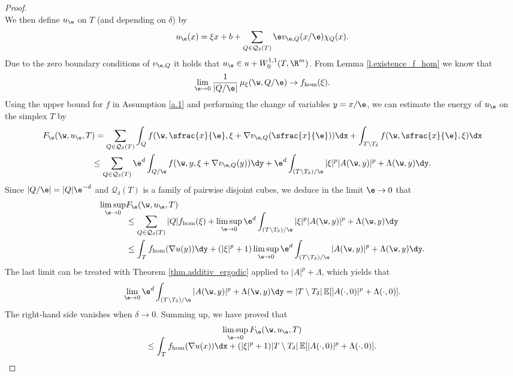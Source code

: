 \begin{proof}
\begin{equation*}
\end{equation*}
We then define $u_{\e}$ on $T$ (and depending on $\delta$) by
\begin{equation*}
u_{\e}(x)=\xi x+b+\sum_{Q\in\mathcal{Q}_{\delta}(T)}\e v_{\e, Q}(x/\e)\chi_{Q}(x).
\end{equation*} Due to the zero boundary conditions of $v_{\e,Q}$ it holds that $u_{\e}\in u+W^{1,1}_0(T,\R^m)$. From Lemma \ref{l.existence_f_hom} we know that
\begin{equation*}
\lim_{\e\to 0}\frac{1}{|Q/\e|}\,\mu_{\xi}(\w,Q/\e)\to f_{\hom}(\xi).
\end{equation*}
Using the upper bound for $f$ in Assumption \ref{a.1} and performing the change of variables $y=x/\e$, we can estimate the energy of $u_{\e}$ on the simplex $T$ by
\begin{multline*}
F_{\e}(\w,u_{\e},T)= \sum_{Q\in\mathcal{Q}_{\delta}(T)}\int_Qf(\w,\sfrac{x}{\e},\xi+\nabla v_{\e,Q}(\sfrac{x}{\e}))\dx+\int_{T\setminus T_{\delta}}f(\w,\sfrac{x}{\e},\xi)\dx
\\
\leq  \sum_{Q\in\mathcal{Q}_{\delta}(T)}\e^{d}\int_{Q/\e}f(\w,y,\xi+\nabla v_{\e,Q}(y))\dy+\e^d\int_{(T\setminus T_{\delta})/\e}|\xi|^p|A(\w,y)|^p+\Lambda(\w,y)\dy.
\end{multline*}
Since $|Q/\e|=|Q|\e^{-d}$ and $\mathcal{Q}_{\delta}(T)$ is a family of pairwise disjoint cubes, we deduce in the limit $\e\to 0$ that
\begin{align*}
\limsup_{\e\to 0}&F_{\e}(\w,u_{\e},T)
\\[-8pt]
&\leq  \sum_{Q\in\mathcal{Q}_{\delta}(T)}|Q|f_{\hom}(\xi)+\limsup_{\e\to 0}\e^d\int_{(T\setminus T_{\delta})/\e}|\xi|^p|A(\w,y)|^p+\Lambda(\w,y)\dy
\\
&\leq  \int_T f_{\hom}(\nabla u(y))\dy+(|\xi|^p+1)\limsup_{\e\to 0}\e^d\int_{(T\setminus T_{\delta})/\e}|A(\w,y)|^p+\Lambda(\w,y)\dy.
\end{align*}
The last limit can be treated with Theorem \ref{thm.additiv_ergodic} applied to $|A|^p+\Lambda$, which yields that
\begin{equation*}
\lim_{\e\to 0}\e^d\int_{(T\setminus T_{\delta})/\e}|A(\w,y)|^p+\Lambda(\w,y)\dy=|T\setminus T_{\delta}|\,\mathbb{E}[|A(\cdot,0)|^p+\Lambda(\cdot,0)].
\end{equation*}
The right-hand side vanishes when $\delta\to 0$. Summing up, we have proved that
\begin{multline}\label{eq:almost_recovery}
\limsup_{\e\to 0}F_{\e}(\w,u_{\e},T)\\[-8pt]
\leq \int_Tf_{\hom}(\nabla u(x))\dx+(|\xi|^p+1)|T\setminus T_{\delta}|\,\mathbb{E}[|A(\cdot,0)|^p+\Lambda(\cdot,0)].

\end{multline}
\end{proof}
